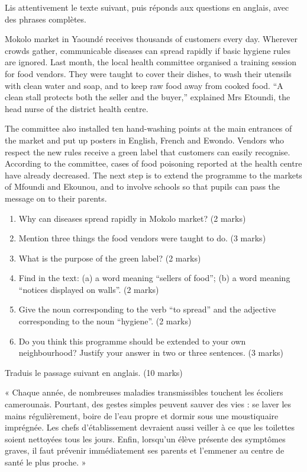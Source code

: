 \documentclass[11pt]{article}
\newcounter{popsec}
\newcounter{popsub}
\newcommand{\courssub}[1]{%
  \stepcounter{popsub}%
  \par\vspace{9pt}\noindent{\popxbold\fontsize{11.5}{13}\selectfont\color{popink}{\color{poporange}\thepopsec.\thepopsub}\hspace{6pt}#1}\par\nopagebreak\vspace{4pt}
}
\begin{document}
\courssub{Je me prépare au Bac}

\begin{exercice}
Lis attentivement le texte suivant, puis réponds aux questions en anglais, avec des phrases complètes.
\begin{textebox}
Mokolo market in Yaoundé receives thousands of customers every day. Wherever crowds gather, communicable diseases can spread rapidly if basic hygiene rules are ignored. Last month, the local health committee organised a training session for food vendors. They were taught to cover their dishes, to wash their utensils with clean water and soap, and to keep raw food away from cooked food. “A clean stall protects both the seller and the buyer,” explained Mrs Etoundi, the head nurse of the district health centre.

The committee also installed ten hand-washing points at the main entrances of the market and put up posters in English, French and Ewondo. Vendors who respect the new rules receive a green label that customers can easily recognise. According to the committee, cases of food poisoning reported at the health centre have already decreased. The next step is to extend the programme to the markets of Mfoundi and Ekounou, and to involve schools so that pupils can pass the message on to their parents.
\end{textebox}
\begin{enumerate}
\item Why can diseases spread rapidly in Mokolo market? (2 marks)
\item Mention three things the food vendors were taught to do. (3 marks)
\item What is the purpose of the green label? (2 marks)
\item Find in the text: (a) a word meaning “sellers of food”; (b) a word meaning “notices displayed on walls”. (2 marks)
\item Give the noun corresponding to the verb “to spread” and the adjective corresponding to the noun “hygiene”. (2 marks)
\item Do you think this programme should be extended to your own neighbourhood? Justify your answer in two or three sentences. (3 marks)
\end{enumerate}
\end{exercice}

\begin{exercice}
Traduis le passage suivant en anglais. (10 marks)

« Chaque année, de nombreuses maladies transmissibles touchent les écoliers camerounais. Pourtant, des gestes simples peuvent sauver des vies : se laver les mains régulièrement, boire de l'eau propre et dormir sous une moustiquaire imprégnée. Les chefs d'établissement devraient aussi veiller à ce que les toilettes soient nettoyées tous les jours. Enfin, lorsqu'un élève présente des symptômes graves, il faut prévenir immédiatement ses parents et l'emmener au centre de santé le plus proche. »
\end{exercice}
\end{document}
